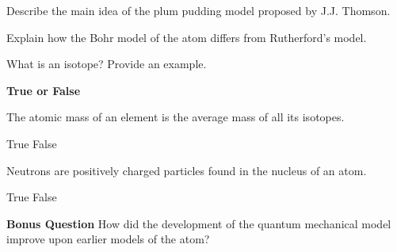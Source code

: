 \documentclass{exam}
\begin{document}
\begin{questions}
\question[5] Describe the main idea of the plum pudding model proposed by J.J. Thomson.  

\makeemptybox{1in}

\question[5] Explain how the Bohr model of the atom differs from Rutherford's model.  

\makeemptybox{1in}

\question[5] What is an isotope? Provide an example.  

\makeemptybox{1in}


\textbf{True or False}

\question[2] The atomic mass of an element is the average mass of all its isotopes.  
\begin{checkboxes}
    \choice True
    \choice False
\end{checkboxes}


\question[2] Neutrons are positively charged particles found in the nucleus of an atom.  
\begin{checkboxes}
    \choice True
    \choice False
\end{checkboxes}

\vspace{1cm}

\textbf{Bonus Question}
\question[5] How did the development of the quantum mechanical model improve upon earlier models of the atom?  





\end{questions}
\end{document}
